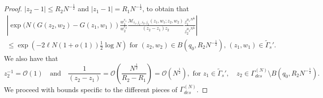 \documentclass[11pt]{article}
\theoremstyle{plain}
\theoremstyle{definition}
\numberwithin{equation}{section}
\begin{document}
\begin{proof}
  $|z_2-1|\leq R_2 N^{-\frac{1}{2}}$ and $|z_1-1|={R_1}{N^{-\frac{1}{2}}}$, to obtain that
 \begin{multline} \label{eqn:INq0}
 \left| \exp(N(G(z_2,w_2)-G(z_1,w_1)) \frac{w_1^{r_1}}{w_2^{r_2}} \frac{\boldsymbol{\mathcal{M}}_{i_1,j_1,i_2,j_2}(z_1,w_1;z_2,w_2)}{(z_2-z_1) z_2} \frac{z_1^{\mu_1 N^{\frac{1}{2}}}}{z_2^{\mu_2N^{\frac{1}{2}}}} \right|
 \\ \leq \exp\left(-2\ell N(1+o(1)) \frac{1}{2}\log N  \right)
 \text{ for $(z_2,w_2)\in B(q_0, R_2 N^{-\frac{1}{2}})$,  $(z_1,w_1)\in \widetilde{\Gamma}_s'$}.
 \end{multline}
%
We also have that
\begin{equation} \label{eqn:trivial}
z_2^{-1}=\mathcal{O}(1)\quad\text{and}\quad \frac{1}{(z_2-z_1)}=\mathcal{O}\left(\frac{N^{\frac{1}{2}}}{R_2-R_1}\right)
=\mathcal{O}(N^{\frac{1}{2}}), \text{ for } z_1\in \widetilde{\Gamma}_s',\quad  z_2\in\Gamma_{des}^{(N)}\setminus B(q_0, R_2N^{-\frac{1}{2}}).
\end{equation}
We proceed with bounds specific to the different pieces of $\Gamma_{des}^{(N)}$.
 

\end{proof}
\end{document}
